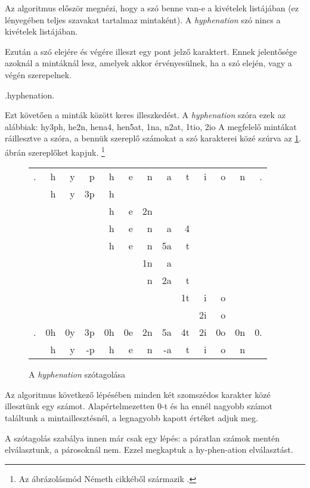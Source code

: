 \documentclass[a4paper, magyar]{article}
\begin{document}
Az algoritmus először megnézi, hogy a szó benne van-e a kivételek listájában (ez lényegében teljes szavakat tartalmaz mintaként). A \textit{hyphenation} szó nincs a kivételek listájában.

Ezután a szó elejére és végére illeszt egy pont  jelző karaktert. Ennek jelentősége azoknál a mintáknál lesz, amelyek akkor érvényesülnek, ha a szó elején, vagy a végén szerepelnek.
{\selectfont
	\begin{center}
	.hyphenation.
	\end{center}
}
Ezt követően a minták között keres illeszkedést. A \textit{hyphenation} szóra ezek az alábbiak: 
{\selectfont hy3ph, he2n, hena4, hen5at, 1na, n2at, 1tio,  2io}  \cite[37.\ oldal]{liang1983word}
A megfelelő mintákat ráillesztve a szóra, a bennük szereplő számokat a szó karakterei közé szúrva az \ref{liang-hyp}. ábrán szereplőket kapjuk.%
\footnote{Az ábrázolásmód N{\'e}meth cikkéből származik \cite{nemeth2006automatic}.}
\begin{figure}[h]\centering
	{\selectfont
		\setlength{\tabcolsep}{0pt}
		\begin{tabular}{rrrrrrrrrrrrr}
			.& h& y& p& h& e& n& a & t& i& o& n& .\\
			 & h& y&3p& h\\
			 &  &  &  & h& e&2n\\
			 &  &  &  & h& e& n& a&4\phantom{t}\\
			 &  &  &  & h& e& n&5a&t\\
			 &  &  &  &  &  &1n& a\\
			 &  &  &  &  &  & n&2a& t\\
			 &  &  &  &  &  &  &  &1t& i& o\\
			 &  &  &  &  &  &  &  &  &2i& o\\
			 \hline
			 .&0h&0y&3p&0h&0e&2n&5a&4t&2i&0o&0n&0.\\
			  & h& y&-p& h& e& n&-a& t& i& o& n
		\end{tabular}
	}
\caption{A \textit{hyphenation} szótagolása}\par\medskip\centering
\label{liang-hyp}
\end{figure}


Az algoritmus következő lépésében minden két szomszédos karakter közé illesztünk egy számot. Alapértelmezetten $0$-t és ha ennél nagyobb számot találtunk a mintaillesztésnél, a legnagyobb kapott értéket adjuk meg.

A szótagolás szabálya innen már csak egy lépés: a páratlan számok mentén elválasztunk, a párosoknál nem. Ezzel megkaptuk a
{\selectfont
	hy-phen-ation%
}
elválasztást.
\end{document}
